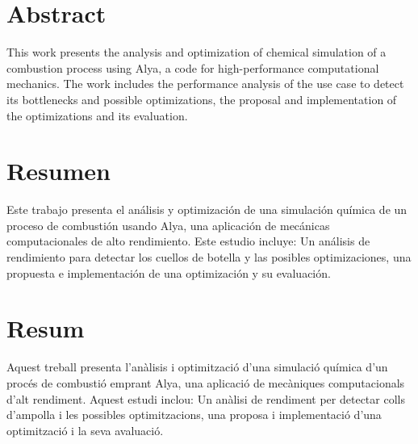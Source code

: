 \chapter*{Abstract}

This work presents the analysis and optimization of chemical simulation of a combustion process using Alya, a code for high-performance computational mechanics. The work includes the performance analysis of the use case to detect its bottlenecks and possible optimizations, the proposal and implementation of the optimizations and its evaluation.

{\let\clearpage\relax \chapter*{Resumen}}

Este trabajo presenta el análisis y optimización de una simulación química de un proceso de combustión usando Alya, una aplicación de mecánicas computacionales de alto rendimiento. Este estudio incluye: Un análisis de rendimiento para detectar los cuellos de botella y las posibles optimizaciones, una propuesta e implementación de una optimización y su evaluación.

{\let\clearpage\relax \chapter*{Resum}}

Aquest treball presenta l'anàlisis i optimització d'una simulació química d'un procés de combustió emprant Alya, una aplicació de mecàniques computacionals d'alt rendiment. Aquest estudi inclou: Un anàlisi de rendiment per detectar colls d'ampolla i les possibles optimitzacions, una proposa i implementació d'una optimització i la seva avaluació.
